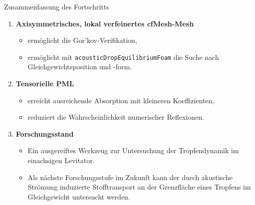 \documentclass[
	german,%
	accentcolor=9c,%
	accept-missing-logos=true,%
]{tudabeamer}
\newcommand*{\code}[1]{\texttt{#1}}
\begin{document}
\begin{frame}{Zusammenfassung des Fortschritts}
    \begin{enumerate}
        \item \textbf{Axisymmetrisches, lokal verfeinertes cfMesh-Mesh}
        \begin{itemize}
            \item ermöglicht die Gor'kov-Verifikation,
            \item ermöglicht mit \code{acousticDropEquilibriumFoam} die Suche
            nach Gleichgewichtsposition und -form.
        \end{itemize}
        \item \textbf{Tensorielle PML}
        \begin{itemize}
            \item erreicht ausreichende Absorption mit kleineren Koeffizienten,
            \item reduziert die Wahrscheinlichkeit numerischer Reflexionen.
        \end{itemize}
        \item \textbf{Forschungsstand}
        \begin{itemize}
            \item Ein ausgereiftes Werkzeug zur Untersuchung der
            Tropfendynamik im einachsigen Levitator.
            \item Als nächste Forschungsstufe im Zukunft kann der durch akustische
            Strömung induzierte Stofftransport an der Grenzfläche eines
            Tropfens im Gleichgewicht untersucht werden.
        \end{itemize}
    \end{enumerate}
\end{frame}
\end{document}

